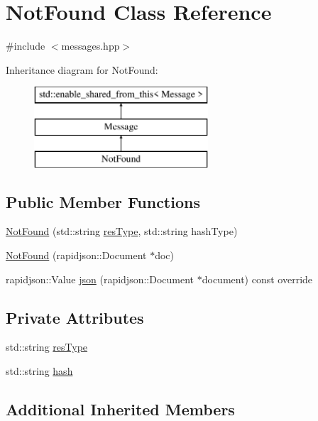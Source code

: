 \hypertarget{classNotFound}{}\section{Not\+Found Class Reference}
\label{classNotFound}


{\ttfamily \#include $<$messages.\+hpp$>$}

Inheritance diagram for Not\+Found\+:\begin{figure}[H]
\begin{center}
\leavevmode
\includegraphics[height=3.000000cm]{classNotFound}
\end{center}
\end{figure}
\subsection*{Public Member Functions}
\begin{DoxyCompactItemize}
\item 
\mbox{\hyperlink{classNotFound_aa7fd834fc95565278a43553d7bae018c}{Not\+Found}} (std\+::string \mbox{\hyperlink{classNotFound_acd2ac9fcbc773b0acbe204fbc100316b}{res\+Type}}, std\+::string hash\+Type)
\item 
\mbox{\hyperlink{classNotFound_a52f321414fbd643f0af503f977f78078}{Not\+Found}} (rapidjson\+::\+Document $\ast$doc)
\item 
rapidjson\+::\+Value \mbox{\hyperlink{classNotFound_a67ee661e6a87c681d167da585c106240}{json}} (rapidjson\+::\+Document $\ast$document) const override
\end{DoxyCompactItemize}
\subsection*{Private Attributes}
\begin{DoxyCompactItemize}
\item 
std\+::string \mbox{\hyperlink{classNotFound_acd2ac9fcbc773b0acbe204fbc100316b}{res\+Type}}
\item 
std\+::string \mbox{\hyperlink{classNotFound_ace964753b12aac33c1f05bbdb6bf813b}{hash}}
\end{DoxyCompactItemize}
\subsection*{Additional Inherited Members}


